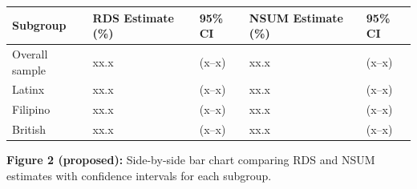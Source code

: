 \documentclass[
  12pt,
  letterpaper,
  DIV=11,
  numbers=noendperiod]{scrartcl}
\theoremstyle{plain}
\theoremstyle{definition}
\begin{document}
\begin{longtable}[]{@{}
  >{\raggedright\arraybackslash}p{}
  >{\raggedright\arraybackslash}p{}
  >{\raggedright\arraybackslash}p{}
  >{\raggedright\arraybackslash}p{}
  >{\raggedright\arraybackslash}p{}@{}}
\toprule\noalign{}
\begin{minipage}[b]{\linewidth}\raggedright
Subgroup
\end{minipage} & \begin{minipage}[b]{\linewidth}\raggedright
RDS Estimate (\%)
\end{minipage} & \begin{minipage}[b]{\linewidth}\raggedright
95\% CI
\end{minipage} & \begin{minipage}[b]{\linewidth}\raggedright
NSUM Estimate (\%)
\end{minipage} & \begin{minipage}[b]{\linewidth}\raggedright
95\% CI
\end{minipage} \\
\midrule\noalign{}
\endhead
\bottomrule\noalign{}
\endlastfoot
Overall sample & xx.x & (x--x) & xx.x & (x--x) \\
Latinx & xx.x & (x--x) & xx.x & (x--x) \\
Filipino & xx.x & (x--x) & xx.x & (x--x) \\
British & xx.x & (x--x) & xx.x & (x--x) \\
\end{longtable}

\textbf{Figure 2 (proposed):} Side-by-side bar chart comparing RDS and
NSUM estimates with confidence intervals for each subgroup.
\end{document}
